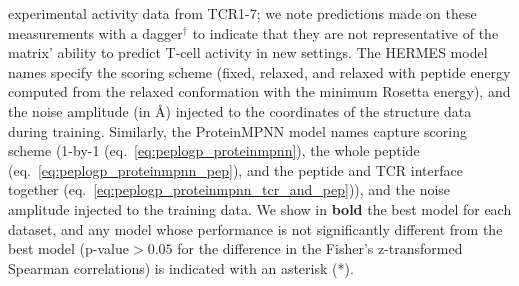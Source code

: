 \begin{table}[ht]
{{experimental activity data from TCR1-7; we note predictions made on these measurements with a
dagger$^\dagger$ to indicate that they are not representative of the matrix' ability to predict
T-cell activity in new settings.
The HERMES model names specify the scoring scheme (fixed, relaxed, and relaxed with peptide energy
computed from the relaxed conformation with the minimum Rosetta energy), and the noise amplitude (in
\AA) injected to the coordinates of the structure data during training. Similarly, the ProteinMPNN
model names capture scoring scheme (1-by-1 (eq.~\ref{eq:peplogp_proteinmpnn}), the whole peptide
(eq.~\ref{eq:peplogp_proteinmpnn_pep}), and the peptide and TCR interface together
(eq.~\ref{eq:peplogp_proteinmpnn_tcr_and_pep})), and the noise amplitude injected to the training
data.
We show in \textbf{bold} the best model for each dataset, and any model whose performance is not
significantly different from the best model (p-value$>0.05$ for the difference in the Fisher's
z-transformed Spearman correlations) is indicated with an asterisk (*).
}}
\label{table:spearmanr_activity}
\end{table}




